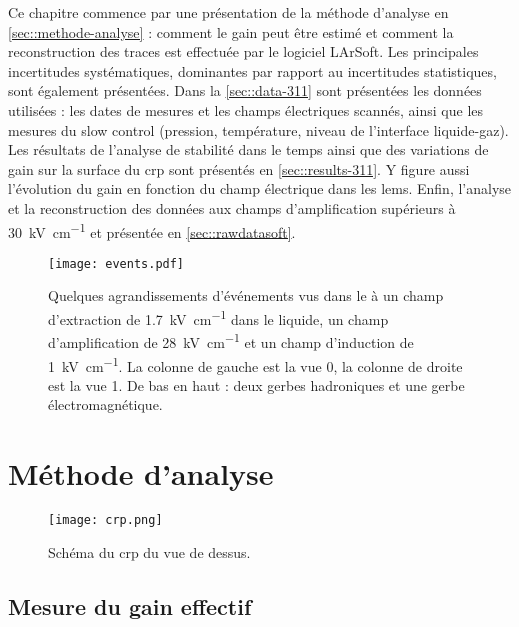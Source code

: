     Ce chapitre commence par une présentation de la méthode d'analyse en \autoref{sec::methode-analyse} : comment le gain peut être estimé et comment la reconstruction des traces est effectuée par le logiciel LArSoft. Les principales incertitudes systématiques, dominantes par rapport au incertitudes statistiques, sont également présentées. Dans la \autoref{sec::data-311} sont présentées les données utilisées : les dates de mesures et les champs électriques scannés, ainsi que les mesures du slow control (pression, température, niveau de l'interface liquide-gaz). Les résultats de l'analyse de stabilité dans le temps ainsi que des variations de gain sur la surface du \gls{crp} sont présentés en \autoref{sec::results-311}. Y figure aussi l'évolution du gain en fonction du champ électrique dans les \glspl{lem}. Enfin, l'analyse et la reconstruction des données aux champs d'amplification supérieurs à \SI{30}{\kilo\volt\per\centi\meter} et présentée en \autoref{sec::rawdatasoft}.

    \begin{figure}[htpb]
      \centering
      \texttt{[image: events.pdf]}
      \caption[Quelques événements vus dans le \TOO{}]{\label{fig::data-sample}Quelques agrandissements  d'événements vus dans le \TOO{} à un champ d'extraction de \SI{1.7}{\kilo\volt\per\centi\meter} dans le liquide, un champ d'amplification de \SI{28}{\kilo\volt\per\centi\meter} et un champ d'induction de \SI{1}{\kilo\volt\per\centi\meter}. La colonne de gauche est la vue 0, la colonne de droite est la vue 1. De bas en haut : deux gerbes hadroniques et une gerbe électromagnétique.}
    \end{figure}
  
  \section{Méthode d'analyse}\label{sec::methode-analyse}

    \begin{figure}[htpb]
      \centering
      \texttt{[image: crp.png]}
      \caption[Schéma du \gls{crp} du \TOO{} vue de dessus.]{\label{fig::crp-chap5}Schéma du \gls{crp} du \TOO{} vue de dessus.}
    \end{figure}

    \subsection{Mesure du gain effectif}

